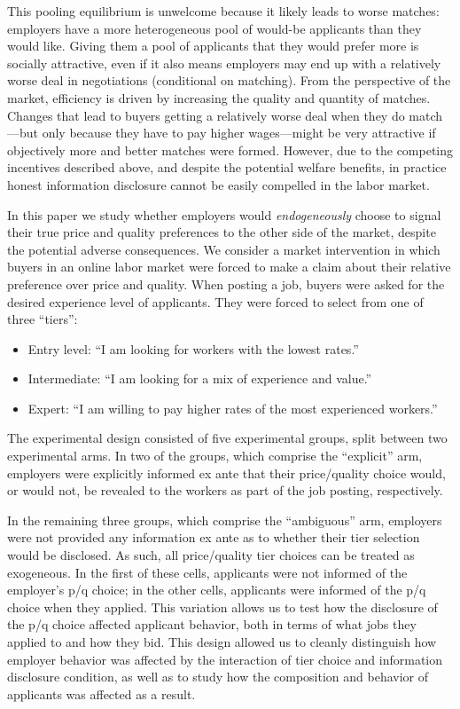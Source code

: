 \documentclass[prodmode,acmec]{ec-acmsmall}
\begin{document}
This pooling equilibrium is unwelcome because it likely leads to worse matches: 
employers have a more heterogeneous pool of would-be applicants than they would like. 
Giving them a pool of applicants that they would prefer more is socially attractive, even if it also means employers may end up with a relatively worse deal in negotiations (conditional on matching).
From the perspective of the market, efficiency is driven by increasing the quality and quantity of matches.
Changes that lead to buyers getting a relatively worse deal when they do match---but only because they have to pay higher wages---might be very attractive if objectively more and better matches were formed.
However, due to the competing incentives described above, and despite the potential welfare benefits, in practice honest information disclosure cannot be easily compelled in the labor market.

In this paper we study whether employers would {\em endogeneously} choose to signal their true price and quality preferences to the other side of the market, despite the potential adverse consequences.
We consider a market intervention in which buyers in an online labor market were forced to make a claim about their relative preference over price and quality. 
When posting a job, buyers were asked for the desired experience level of applicants.
They were forced to select from one of three ``tiers'': 
\begin{itemize}
\item Entry level: ``I am looking for workers with the lowest rates.''
\item Intermediate: ``I am looking for a mix of experience and value.''
\item Expert: ``I am willing to pay higher rates of the most experienced workers.''
\end{itemize} 
The experimental design consisted of five experimental groups, split between two experimental arms.
In two of the groups, which comprise the ``explicit'' arm, employers were explicitly informed ex ante that their price/quality choice would, or would not, be revealed to the workers as part of the job posting, respectively.

In the remaining three groups, which comprise the ``ambiguous'' arm, employers were not provided any information ex ante as to whether their tier selection would be disclosed.
As such, all price/quality tier choices can be treated as exogeneous.
In the first of these cells, applicants were not informed of the employer's p/q choice;
in the other cells, applicants were informed of the p/q choice when they applied.
This variation allows us to test how the disclosure of the p/q choice affected applicant behavior, both in terms of what jobs they applied to and how they bid. 
This design allowed us to cleanly distinguish how employer behavior was affected by the interaction of tier choice and information disclosure condition, as well as to study how the composition and behavior of applicants was affected as a result.
\end{document}
